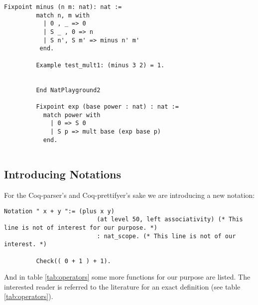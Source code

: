 	   \begin{lstlisting}[label = lst:minus_nat, caption={ \lstinline!minus! and \lstinline!exp!}]
	    Fixpoint minus (n m: nat): nat :=
	     match n, m with
	       | 0 , _ => 0
	       | S _ , 0 => n
	       | S n', S m' => minus n' m'
	      end.
	      
	     Example test_mult1: (minus 3 2) = 1.
	     
	      
	     End NatPlayground2
	     
	     Fixpoint exp (base power : nat) : nat :=
	       match power with
	         | 0 => S 0
	         | S p => mult base (exp base p)
	       end.
	         
	   \end{lstlisting}
	   
   \subsection{Introducing Notations}
	
	    For the Coq-parser's and Coq-prettifyer's sake we are introducing a new notation:
	    
	    \begin{lstlisting}[caption= operator overloading of \lstinline!+!] 
	     Notation " x + y ":= (plus x y)
	                      (at level 50, left associativity) (* This line is not of interest for our purpose. *)
	                      : nat_scope. (* This line is not of our interest. *)
	                      
	     Check(( 0 + 1 ) + 1).
	    \end{lstlisting}    
	   And in table \ref{tab:operators} some more functions for our purpose are listed.
	   The interested reader is referred to the literature for an exact definition (see table \ref{tab:operators}).  
	   
